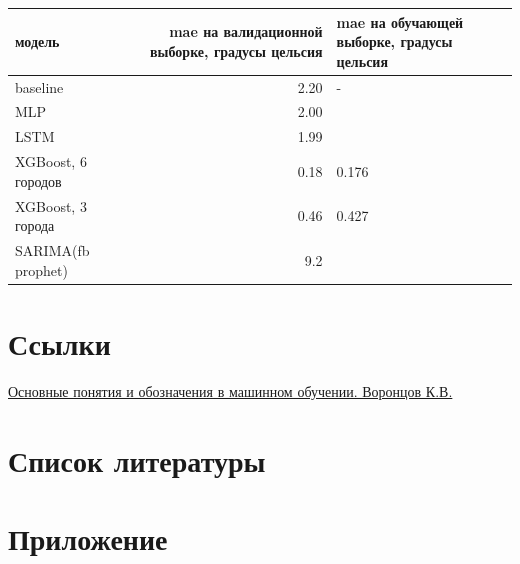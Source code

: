 \documentclass[11pt]{article}
\begin{document}
\begin{center}
\begin{tabular}{lrl}
модель & mae на валидационной выборке, градусы цельсия & mae на обучающей выборке, градусы цельсия\\
\hline
baseline & 2.20 & -\\
MLP & 2.00 & \\
LSTM & 1.99 & \\
XGBoost, 6 городов & 0.18 & 0.176\\
XGBoost, 3 города & 0.46 & 0.427\\
SARIMA(fb prophet) & 9.2 & \\
\hline
\end{tabular}
\end{center}

\section{Ссылки}
\label{sec:org60607c4}
\href{http://www.machinelearning.ru/wiki/images/archive/f/fc/20130211221536\%21Voron-ML-Intro-slides.pdf}{Основные понятия и обозначения в машинном обучении. Воронцов К.В.}
\section{Список литературы}
\label{sec:org5a3ab64}


\section{Приложение}
\label{sec:org2e8d6ae}
\end{document}
